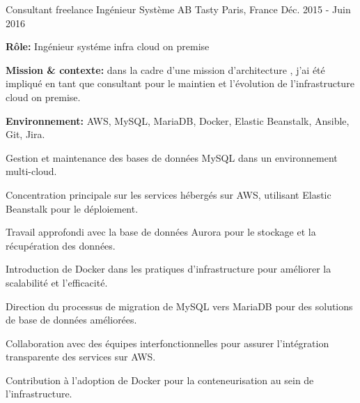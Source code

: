\begin{cventries}
\cventry
{Consultant freelance Ingénieur Système} %
{AB Tasty} %
{Paris, France} %
{Déc. 2015 - Juin 2016} %
{
  \begin{cvitems} %
    \item {\textbf{Rôle:} Ingénieur systéme  infra cloud on premise}
    \item {\textbf{Mission \& contexte:} dans la cadre d'une mission d'architecture , j'ai été impliqué en tant que consultant pour le maintien et l'évolution de l'infrastructure cloud on premise.}
    \item {\textbf{Environnement:} AWS, MySQL, MariaDB, Docker, Elastic Beanstalk, Ansible, Git, Jira.}
    \item {Gestion et maintenance des bases de données MySQL dans un environnement multi-cloud.}
    \item {Concentration principale sur les services hébergés sur AWS, utilisant Elastic Beanstalk pour le déploiement.}
    \item {Travail approfondi avec la base de données Aurora pour le stockage et la récupération des données.}
    \item {Introduction de Docker dans les pratiques d'infrastructure pour améliorer la scalabilité et l'efficacité.}
    \item {Direction du processus de migration de MySQL vers MariaDB pour des solutions de base de données améliorées.}
    \item {Collaboration avec des équipes interfonctionnelles pour assurer l'intégration transparente des services sur AWS.}
    \item {Contribution à l'adoption de Docker pour la conteneurisation au sein de l'infrastructure.}
  \end{cvitems}
}


\end{cventries}
